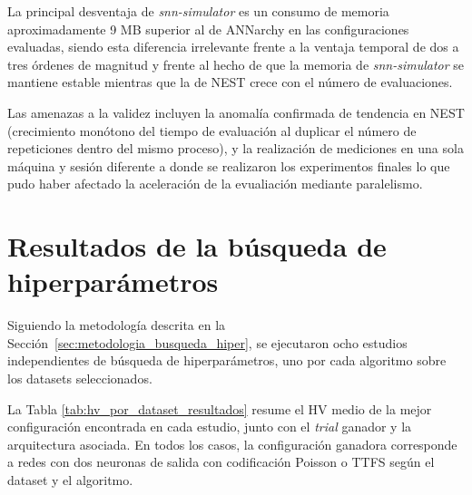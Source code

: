 La principal desventaja de \textit{snn-simulator} es un consumo de memoria aproximadamente 9 MB superior al de ANNarchy en las configuraciones evaluadas, siendo esta diferencia irrelevante frente a la ventaja temporal de dos a tres órdenes de magnitud y frente al hecho de que la memoria de \textit{snn-simulator} se mantiene estable mientras que la de NEST crece con el número de evaluaciones.

Las amenazas a la validez incluyen la anomalía confirmada de tendencia en NEST (crecimiento monótono del tiempo de evaluación al duplicar el número de repeticiones dentro del mismo proceso), y la realización de mediciones en una sola máquina y sesión diferente a donde se realizaron los experimentos finales lo que pudo haber afectado la aceleración de la evualiación mediante paralelismo.



\section{Resultados de la búsqueda de hiperparámetros}

Siguiendo la metodología descrita en la Sección~\ref{sec:metodologia_busqueda_hiper}, se ejecutaron ocho estudios independientes de búsqueda de hiperparámetros, uno por cada algoritmo sobre los datasets seleccionados.

La Tabla \ref{tab:hv_por_dataset_resultados} resume el HV medio de la mejor configuración encontrada en cada estudio, junto con el \emph{trial} ganador y la arquitectura asociada. En todos los casos, la configuración ganadora corresponde a redes con dos neuronas de salida con codificación Poisson o TTFS según el dataset y el algoritmo.

